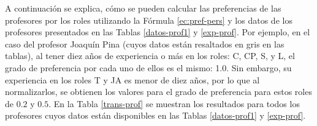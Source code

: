 \begin{table}[H]
	\centering
	\caption{Resultado de la transformación de las competencias técnicas de los profesores}\label{result-prof}
\end{table}

\begin{table}[H]
	\centering
	\caption{Años de experiencia de los profesores}\label{exp-prof}
\end{table}

A continuación se explica, cómo se pueden calcular las preferencias de las profesores por los roles utilizando la Fórmula \ref{ec:pref-pers} y los datos de los profesores presentados en las Tablas \ref{datos-prof1} y \ref{exp-prof}. Por ejemplo, en el caso del profesor Joaquín Pina (cuyos datos están resaltados en gris en las tablas), al tener diez años de experiencia o más en los roles: C, CP, S, y L, el grado de preferencia por cada uno de ellos es el mismo: 1.0. Sin embargo, su experiencia en los roles T y JA es menor de diez años, por lo que al normalizarlos, se obtienen los valores para el grado de preferencia para estos roles de $0.2$ y $0.5$. En la Tabla \ref{trans-prof} se muestran los resultados para todos los profesores cuyos datos están disponibles en las Tablas \ref{datos-prof1} y \ref{exp-prof}.


